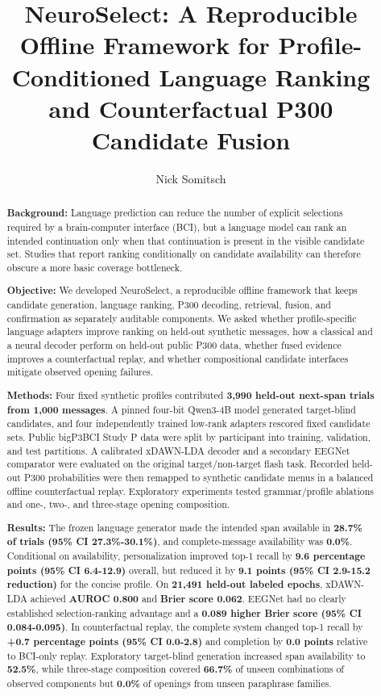 \documentclass[11pt]{article}
\title{NeuroSelect: A Reproducible Offline Framework for Profile-Conditioned Language Ranking and Counterfactual P300 Candidate Fusion}
\author{Nick Somitsch}
\date{}
\begin{document}
\maketitle

\begin{abstract}

\textbf{Background:} Language prediction can reduce the number of explicit selections required by a brain-computer interface (BCI), but a language model can rank an intended continuation only when that continuation is present in the visible candidate set. Studies that report ranking conditionally on candidate availability can therefore obscure a more basic coverage bottleneck.


\textbf{Objective:} We developed NeuroSelect, a reproducible offline framework that keeps candidate generation, language ranking, P300 decoding, retrieval, fusion, and confirmation as separately auditable components. We asked whether profile-specific language adapters improve ranking on held-out synthetic messages, how a classical and a neural decoder perform on held-out public P300 data, whether fused evidence improves a counterfactual replay, and whether compositional candidate interfaces mitigate observed opening failures.


\textbf{Methods:} Four fixed synthetic profiles contributed \textbf{3,990 held-out next-span trials from 1,000 messages}. A pinned four-bit Qwen3-4B model generated target-blind candidates, and four independently trained low-rank adapters rescored fixed candidate sets. Public bigP3BCI Study P data were split by participant into training, validation, and test partitions. A calibrated xDAWN-LDA decoder and a secondary EEGNet comparator were evaluated on the original target/non-target flash task. Recorded held-out P300 probabilities were then remapped to synthetic candidate menus in a balanced offline counterfactual replay. Exploratory experiments tested grammar/profile ablations and one-, two-, and three-stage opening composition.


\textbf{Results:} The frozen language generator made the intended span available in \textbf{28.7\% of trials (95\% CI 27.3\%-30.1\%)}, and complete-message availability was \textbf{0.0\%}. Conditional on availability, personalization improved top-1 recall by \textbf{9.6 percentage points (95\% CI 6.4-12.9)} overall, but reduced it by \textbf{9.1 points (95\% CI 2.9-15.2 reduction)} for the concise profile. On \textbf{21,491 held-out labeled epochs}, xDAWN-LDA achieved \textbf{AUROC 0.800} and \textbf{Brier score 0.062}. EEGNet had no clearly established selection-ranking advantage and a \textbf{0.089 higher Brier score (95\% CI 0.084-0.095)}. In counterfactual replay, the complete system changed top-1 recall by \textbf{+0.7 percentage points (95\% CI 0.0-2.8)} and completion by \textbf{0.0 points} relative to BCI-only replay. Exploratory target-blind generation increased span availability to \textbf{52.5\%}, while three-stage composition covered \textbf{66.7\%} of unseen combinations of observed components but \textbf{0.0\%} of openings from unseen paraphrase families.



\end{abstract}
\end{document}
